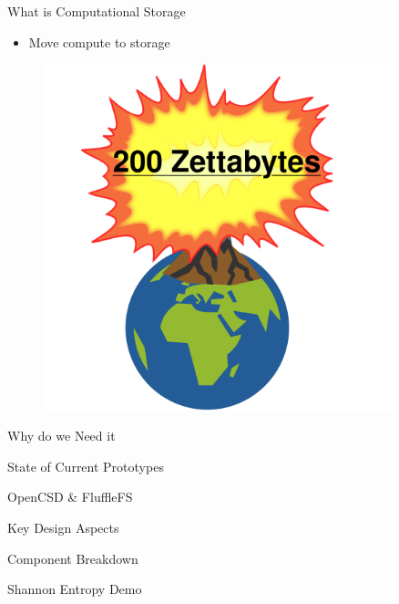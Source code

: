 \documentclass{beamer}
\begin{document}
\begin{frame}{What is Computational Storage}
    \begin{itemize}
        \item Move compute to storage
    \end{itemize}
    \begin{figure}
        \centering
        \includegraphics[width=0.9\textwidth]{resources/images/data-problem.png}
    \end{figure}
\end{frame}

\begin{frame}{Why do we Need it}
\end{frame}

\begin{frame}{State of Current Prototypes}
\end{frame}

\begin{frame}{OpenCSD \& FluffleFS}
\end{frame}

\begin{frame}{Key Design Aspects}
\end{frame}

\begin{frame}{Component Breakdown}
\end{frame}

\begin{frame}{Shannon Entropy Demo}
\end{frame}
\end{document}
